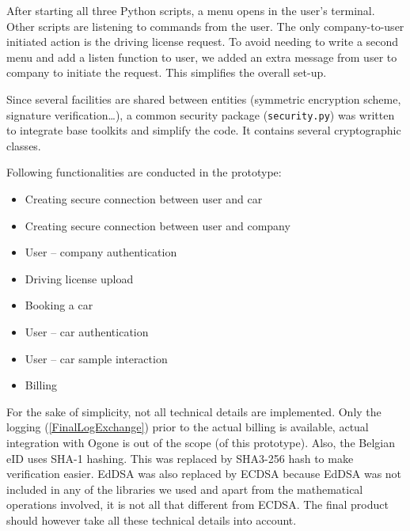 After starting all three Python scripts, a menu opens in the user's terminal. Other scripts are listening to commands from the user. The only company-to-user initiated action is the driving license request. To avoid needing to write a second menu and add a listen function to user, we added an extra message from user to company to initiate the request. This simplifies the overall set-up.

Since several facilities are shared between entities (symmetric encryption scheme, signature verification\ldots), a common security package (\lstinline{security.py}) was written to integrate base toolkits and simplify the code. It contains several cryptographic classes.

Following functionalities are conducted in the prototype:
\begin{itemize}
	\item Creating secure connection between user and car
	\item Creating secure connection between user and company
	\item User -- company authentication
	\item Driving license upload
	\item Booking a car
	\item User -- car authentication
	\item User -- car sample interaction
	\item Billing
\end{itemize}

For the sake of simplicity, not all technical details are implemented. Only the logging (\cref{FinalLogExchange}) prior to the actual billing is available, actual integration with Ogone is out of the scope (of this prototype). Also, the Belgian eID uses SHA-1 hashing. This was replaced by SHA3-256 hash to make verification easier. EdDSA was also replaced by ECDSA because EdDSA was not included in any of the libraries we used and apart from the mathematical operations involved, it is not all that different from ECDSA. The final product should however take all these technical details into account.
